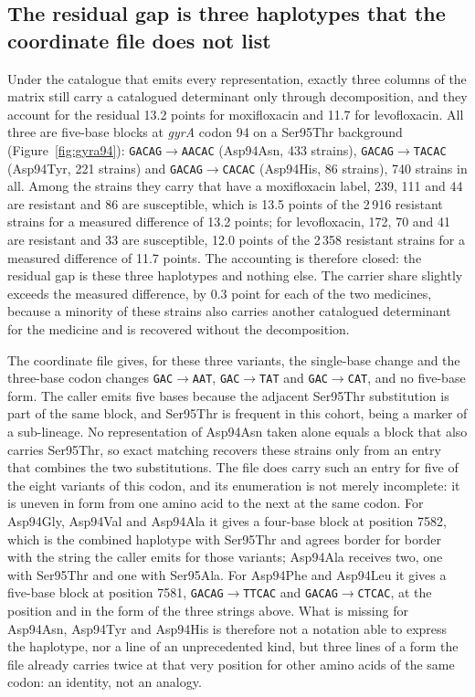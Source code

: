 \documentclass[11pt]{article}
\begin{document}
\subsection{The residual gap is three haplotypes that the coordinate file does not list}
\label{sec:residuel}
Under the catalogue that emits every representation, exactly three columns of the matrix
still carry a catalogued determinant only through decomposition, and they account for the
residual 13.2 points for moxifloxacin and 11.7 for levofloxacin. All three are five-base blocks at \textit{gyrA} codon 94 on
a Ser95Thr background (Figure~\ref{fig:gyra94}):
\texttt{GACAG}$\rightarrow$\texttt{AACAC} (Asp94Asn, 433 strains),
\texttt{GACAG}$\rightarrow$\texttt{TACAC} (Asp94Tyr, 221 strains) and
\texttt{GACAG}$\rightarrow$\texttt{CACAC} (Asp94His, 86 strains), 740 strains in all. Among
the strains they carry that have a moxifloxacin label, 239, 111 and 44 are resistant and 86
are susceptible, which is 13.5 points of the 2\,916 resistant strains for a measured
difference of 13.2 points; for levofloxacin, 172, 70 and 41 are resistant and 33 are
susceptible, 12.0 points of the 2\,358 resistant strains for a measured difference of 11.7
points. The accounting is therefore closed: the residual gap is these three haplotypes and
nothing else. The carrier share slightly exceeds the measured difference, by 0.3 point for
each of the two medicines, because a minority of these strains also carries another
catalogued determinant for the medicine and is recovered without the decomposition.

The coordinate file gives, for these three variants, the single-base change and the
three-base codon changes \texttt{GAC}$\rightarrow$\texttt{AAT},
\texttt{GAC}$\rightarrow$\texttt{TAT} and \texttt{GAC}$\rightarrow$\texttt{CAT}, and no
five-base form. The caller emits five bases because the adjacent Ser95Thr substitution is
part of the same block, and Ser95Thr is frequent in this cohort, being a marker of a
sub-lineage. No representation of Asp94Asn taken alone equals a block that also carries
Ser95Thr, so exact matching recovers these strains only from an entry that combines the two
substitutions. The file does carry such an entry for five of the eight variants of this codon,
and its enumeration is not merely incomplete: it is uneven in form from one amino acid to the
next at the same codon. For Asp94Gly, Asp94Val and Asp94Ala it gives a four-base block at
position 7582, which is the combined haplotype with Ser95Thr and agrees border for border
with the string the caller emits for those variants; Asp94Ala receives two, one with Ser95Thr
and one with Ser95Ala. For Asp94Phe and Asp94Leu it gives a five-base block at position 7581,
\texttt{GACAG}$\rightarrow$\texttt{TTCAC} and \texttt{GACAG}$\rightarrow$\texttt{CTCAC}, at
the position and in the form of the three strings above. What is missing for Asp94Asn,
Asp94Tyr and Asp94His is therefore not a notation able to express the haplotype, nor a line of
an unprecedented kind, but three lines of a form the file already carries twice at that very
position for other amino acids of the same codon: an identity, not an analogy.
\end{document}
